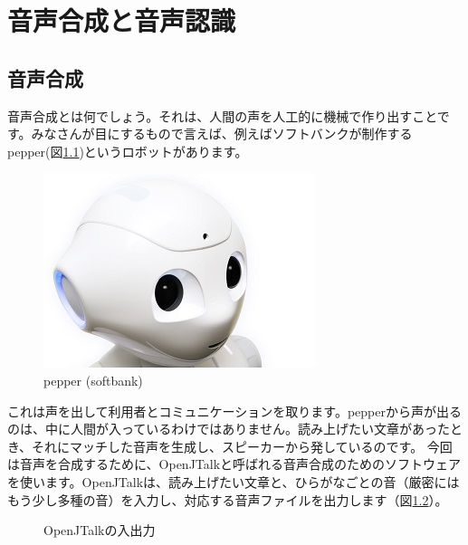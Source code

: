 \chapter{音声合成と音声認識}
\section{音声合成}
音声合成とは何でしょう。それは、人間の声を人工的に機械で作り出すことです。みなさんが目にするもので言えば、例えばソフトバンクが制作するpepper(図\ref{pepper})というロボットがあります。

\begin{figure}[H]
\begin{center}
    \includegraphics[width=0.5\linewidth]{images/chap06/text06-img001.jpg}
    \caption{pepper (softbank)}
    \label{pepper}
\end{center}
\end{figure}

これは声を出して利用者とコミュニケーションを取ります。pepperから声が出るのは、中に人間が入っているわけではありません。読み上げたい文章があったとき、それにマッチした音声を生成し、スピーカーから発しているのです。
今回は音声を合成するために、OpenJTalkと呼ばれる音声合成のためのソフトウェアを使います。OpenJTalkは、読み上げたい文章と、ひらがなごとの音（厳密にはもう少し多種の音）を入力し、対応する音声ファイルを出力します（図\ref{OpenJTalkの入出力}）。

\begin{figure}[H]
\begin{center}
    
    \caption{OpenJTalkの入出力}
    \label{OpenJTalkの入出力}
\end{center}
\end{figure}

\begin{tcolorbox}[title=\useOmetoi]
\begin{enumerate}
\end{enumerate}
\end{tcolorbox}

